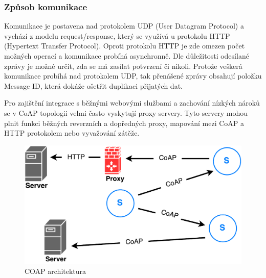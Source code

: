    \subsubsection{Způsob komunikace}
   Komunikace je postavena nad protokolem UDP (User Datagram Protocol) a vychází
   z modelu request/response, který se využívá u protokolu HTTP (Hypertext
   Transfer Protocol). Oproti protokolu HTTP je zde omezen počet možných operací
   a komunikace probíhá asynchronně. Dle důležitosti odesílané zprávy je možné určit,
   zda se má zasílat potvrzení či nikoli. Protože veškerá komunikace probíhá nad
   protokolem UDP, tak přenášené zprávy obsahují položku Message ID, která dokáže
   ošetřit duplikaci přijatých dat.
   
   Pro zajištění integrace s běžnými webovými službami a zachování nízkých nároků
   se v CoAP topologii velmi často vyskytují proxy servery. Tyto servery mohou plnit
   funkci běžných reverzních a dopředných proxy, mapování mezi CoAP a HTTP protokolem
   nebo vyvažování zátěže. 
   
   \begin{figure}[ht]
   \begin{center}
   \includegraphics[scale=0.41]{pictures/coap-arch}
   \caption{COAP architektura}
   \label{obr.coap-arch}
   \end{center}
   \end{figure}
   
